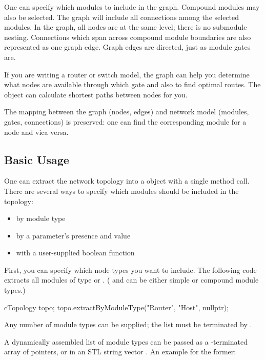 One can specify which modules to include in the graph. Compound modules
may also be selected. The graph will include all connections among the
selected modules. In the graph, all nodes are at the same level;
there is no submodule nesting.  Connections which span across compound
module boundaries are also represented as one graph edge. Graph edges
are directed, just as module gates are.

If you are writing a router or switch model, the 
graph can help you determine what nodes are available through which
gate and also to find optimal routes. The
 object can calculate shortest paths between nodes for you.

The mapping between the graph (nodes, edges) and network model (modules,
gates, connections) is preserved: one can find the corresponding module for
a  node and vica versa.


\subsection{Basic Usage}
\label{sec:sim-lib:ctopology-basic-usage}

One can extract the network topology into a 
object with a single method call. There are several ways to specify
which modules should be included in the topology:

\begin{itemize}
  \item by module type
  \item by a parameter's presence and value
  \item with a user-supplied boolean function
\end{itemize}

First, you can specify which node types you want to include. The
following code extracts all modules of type  or .
( and  can be either simple or compound module types.)

\begin{cpp}
cTopology topo;
topo.extractByModuleType("Router", "Host", nullptr);
\end{cpp}

Any number of module types can be supplied; the list must be terminated by .

A dynamically assembled list of module types can be passed as a
-terminated array of  pointers, or
in an STL string vector .
An example for the former:


